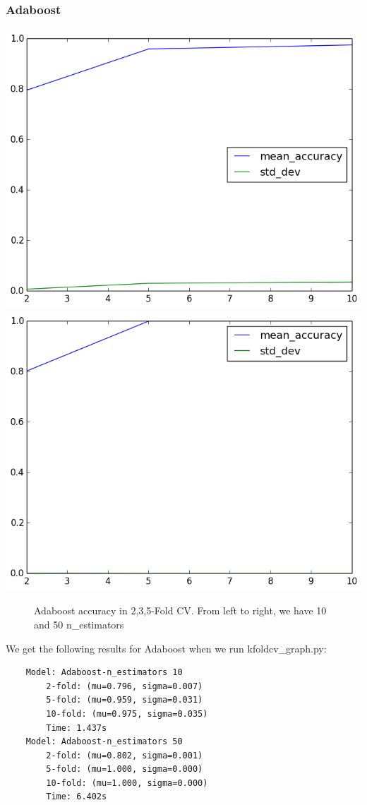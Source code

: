 \documentclass[fleqn]{article}
\begin{document}
    \subsubsection{Adaboost}
    \begin{center}
        \includegraphics[scale=0.3]{model_accuracy_vs_folds_Adaboost-n_estimators10.png}
        \includegraphics[scale=0.3]{model_accuracy_vs_folds_Adaboost-n_estimators50.png}
        \begin{figure}[!h]
            \caption{Adaboost accuracy in 2,3,5-Fold CV. From left to right, we have 10
            and 50 n_estimators}
        \end{figure}
    \end{center}
    We get the following results for Adaboost when we run kfoldcv\_graph.py:
    \begin{lstlisting}
    Model: Adaboost-n_estimators 10
        2-fold: (mu=0.796, sigma=0.007)
        5-fold: (mu=0.959, sigma=0.031)
        10-fold: (mu=0.975, sigma=0.035)
        Time: 1.437s
    Model: Adaboost-n_estimators 50
        2-fold: (mu=0.802, sigma=0.001)
        5-fold: (mu=1.000, sigma=0.000)
        10-fold: (mu=1.000, sigma=0.000)
        Time: 6.402s
    \end{lstlisting}
\end{document}

